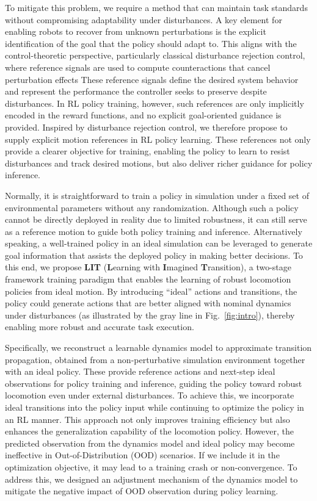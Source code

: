 To mitigate this problem, we require a method that can maintain task standards without compromising adaptability under disturbances.  
A key element for enabling robots to recover from unknown perturbations is the explicit identification of the goal that the policy should adapt to. 
This aligns with the control-theoretic perspective, particularly classical disturbance rejection control, where reference signals are used to compute counteractions that cancel perturbation effects
These reference signals define the desired system behavior and represent the performance the controller seeks to preserve despite disturbances.
In RL policy training, however, such references are only implicitly encoded in the reward functions, and no explicit goal-oriented guidance is provided.
Inspired by disturbance rejection control, we therefore propose to supply explicit motion references in RL policy learning.
These references not only provide a clearer objective for training, enabling the policy to learn to resist disturbances and track desired motions, but also deliver richer guidance for policy inference.

Normally, it is straightforward to train a policy in simulation under a fixed set of environmental parameters without any randomization.
Although such a policy cannot be directly deployed in reality due to limited robustness, it can still serve as a reference motion to guide both policy training and inference. Alternatively speaking, a well-trained policy in an ideal simulation can be leveraged to generate goal information that assists the deployed policy in making better decisions. 
To this end, we propose \textbf{LIT} (\textbf{L}earning with \textbf{I}magined \textbf{T}ransition), a two-stage framework training paradigm that enables the learning of robust locomotion policies from ideal motion. 
By introducing “ideal” actions and transitions, the policy could generate actions that are better aligned with nominal dynamics under disturbances (as illustrated by the gray line in Fig.~\ref{fig:intro}), thereby enabling more robust and accurate task execution.

Specifically, we reconstruct a learnable dynamics model to approximate transition propagation, obtained from a non-perturbative simulation environment together with an ideal policy. 
These provide reference actions and next-step ideal observations for policy training and inference, guiding the policy toward robust locomotion even under external disturbances.
To achieve this, we incorporate ideal transitions into the policy input while continuing to optimize the policy in an RL manner.
This approach not only improves training efficiency but also enhances the generalization capability of the locomotion policy. 
However, the predicted observation from the dynamics model and ideal policy may become ineffective in Out-of-Distribution (OOD) scenarios. 
If we include it in the optimization objective, it may lead to a training crash or non-convergence.
To address this, we designed an adjustment mechanism of the dynamics model to mitigate the negative impact of OOD observation during policy learning.

